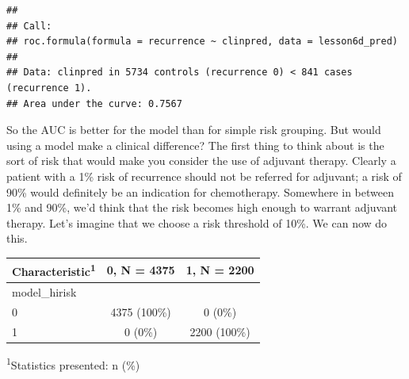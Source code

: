 \documentclass[]{book}
\newenvironment{Shaded}{\begin{snugshade}}{\end{snugshade}}
\newcommand{\CommentTok}[1]{\textcolor[rgb]{0.56,0.35,0.01}{\textit{#1}}}
\newcommand{\DataTypeTok}[1]{\textcolor[rgb]{0.13,0.29,0.53}{#1}}
\newcommand{\DecValTok}[1]{\textcolor[rgb]{0.00,0.00,0.81}{#1}}
\newcommand{\FloatTok}[1]{\textcolor[rgb]{0.00,0.00,0.81}{#1}}
\newcommand{\KeywordTok}[1]{\textcolor[rgb]{0.13,0.29,0.53}{\textbf{#1}}}
\newcommand{\NormalTok}[1]{#1}
\newcommand{\OperatorTok}[1]{\textcolor[rgb]{0.81,0.36,0.00}{\textbf{#1}}}
\newcommand{\StringTok}[1]{\textcolor[rgb]{0.31,0.60,0.02}{#1}}
\begin{document}
\begin{verbatim}
## 
## Call:
## roc.formula(formula = recurrence ~ clinpred, data = lesson6d_pred)
## 
## Data: clinpred in 5734 controls (recurrence 0) < 841 cases (recurrence 1).
## Area under the curve: 0.7567
\end{verbatim}

So the AUC is better for the model than for simple risk grouping. But would using a model make a clinical difference? The first thing to think about is the sort of risk that would make you consider the use of adjuvant therapy. Clearly a patient with a 1\% risk of recurrence should not be referred for adjuvant; a risk of 90\% would definitely be an indication for chemotherapy. Somewhere in between 1\% and 90\%, we'd think that the risk becomes high enough to warrant adjuvant therapy. Let's imagine that we choose a risk threshold of 10\%. We can now do this.

\begin{Shaded}
\end{Shaded}

\captionsetup[table]{labelformat=empty,skip=1pt}
\begin{longtable}{lcc}
\toprule
\textbf{Characteristic}\textsuperscript{1} & \textbf{0}, N = 4375 & \textbf{1}, N = 2200 \\ 
\midrule
model\_hirisk &  &  \\ 
0 & 4375 (100\%) & 0 (0\%) \\ 
1 & 0 (0\%) & 2200 (100\%) \\ 
\bottomrule
\end{longtable}
\vspace{-5mm}
\begin{minipage}{\linewidth}
\textsuperscript{1}Statistics presented: n (\%) \\ 
\end{minipage}
\end{document}
